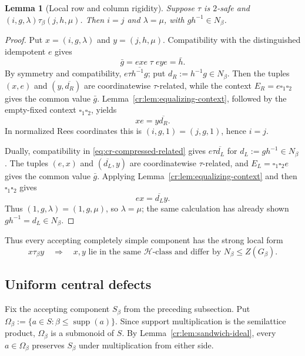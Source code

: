 \documentclass[10pt,a4paper]{article}
\newtheorem{lemma}[theorem]{Lemma}
\theoremstyle{definition}
\theoremstyle{remark}
\newcommand{\blank}{\square}
\begin{document}
\begin{lemma}[Local row and column rigidity]
\label{cr:lem:index-rigidity}
Suppose $\tau$ is $2$-safe and
\((i,g,\lambda)\tau_\beta(j,h,\mu)\).  Then $i=j$ and $\lambda=\mu$, with
\(gh^{-1}\in N_\beta\).
\end{lemma}

\begin{proof}
Put $x=(i,g,\lambda)$ and $y=(j,h,\mu)$.  Compatibility with the
distinguished idempotent $e$ gives
\begin{equation}
\bar g=exe\;\tau\;eye=\bar h.
\label{eq:cr-compressed-related}
\end{equation}
By symmetry and compatibility,
\(e\tau\overline{h^{-1}g}\); put $d_R:=h^{-1}g\in N_\beta$.
Then the tuples $(x,e)$ and $(y,\overline{d_R})$ are coordinatewise
$\tau$-related, while the context
\(E_R=e\blank_1\blank_2\) gives the common value $\bar g$.
Lemma~\ref{cr:lem:equalizing-context}, followed by the empty-fixed context
$\blank_1\blank_2$, yields
\[
xe=y\overline{d_R}.
\]
In normalized Rees coordinates this is
$(i,g,1)=(j,g,1)$, hence $i=j$.

Dually, compatibility in \eqref{eq:cr-compressed-related} gives
$e\tau\overline{d_L}$ for $d_L:=gh^{-1}\in N_\beta$.
The tuples $(e,x)$ and $(\overline{d_L},y)$ are coordinatewise
$\tau$-related, and
\(E_L=\blank_1\blank_2e\) gives the common value $\bar g$.
Applying Lemma~\ref{cr:lem:equalizing-context} and then
$\blank_1\blank_2$ gives
\[
ex=\overline{d_L}y.
\]
Thus $(1,g,\lambda)=(1,g,\mu)$, so $\lambda=\mu$; the same calculation has
already shown $gh^{-1}=d_L\in N_\beta$.
\end{proof}

Thus every accepting completely simple component has the strong local form
\[
x\tau_\beta y
\quad\Longrightarrow\quad
x,y\text{ lie in the same }\mathcal H\text{-class and differ by }
N_\beta\le Z(G_\beta).
\tag{LR}
\]

\subsection{Uniform central defects}

Fix the accepting component $S_\beta$ from the preceding subsection. Put
\(\Omega_\beta:=\{a\in S:\beta\le\operatorname{supp}(a)\}.\)
Since support multiplication is the semilattice product, \(\Omega_\beta\) is a
submonoid of \(S\).  By Lemma~\ref{cr:lem:sandwich-ideal}, every
\(a\in\Omega_\beta\) preserves \(S_\beta\) under multiplication from either
side.
\end{document}
